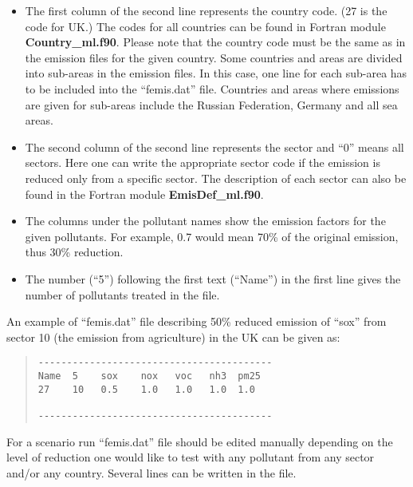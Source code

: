 \begin{itemize}

\item The first column of
the second line represents the country code. (27 is the code for UK.)
The codes for all countries can be found in  Fortran module {\bf
  Country\_ml.f90}. Please note that the country code must be the same
as in the emission files for the given country. Some
countries and areas are divided into sub-areas in the emission
files. In this case, one line for each sub-area has to be included
into the ``femis.dat'' file. Countries and areas where emissions are
given for sub-areas include the Russian Federation, Germany and all 
sea areas.    

\item The second
column of the second line 
represents the sector and ``0'' means all sectors. Here one can write
the appropriate sector code if the emission is reduced only from a specific
sector. The description of each sector can also be found in the Fortran
module {\bf EmisDef\_ml.f90}. 

\item The columns under the pollutant names show the emission factors
  for the given pollutants. For example, 0.7 would mean 70\% of the
  original emission, thus 30\% reduction.

\item The number (``5'') following
the first text (``Name'') in the first line gives the number of
pollutants treated in the file.   
              
\end{itemize}


An example of ``femis.dat'' file describing 50\% reduced emission of
``sox'' from sector 10 (the emission from agriculture) in the UK can be given as:  
\begin{quote}
\begin{verbatim}
-----------------------------------------
Name  5    sox    nox   voc   nh3  pm25 
27    10   0.5    1.0   1.0   1.0  1.0   

-----------------------------------------
\end{verbatim}        
\end{quote}
For a scenario run ``femis.dat'' file should be edited 
manually depending on the level of
reduction one would like to test with any pollutant from any sector
and/or any country. Several lines can be written in the file.
